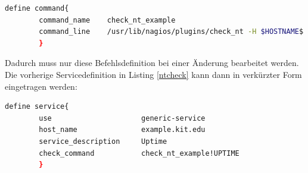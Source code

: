 \begin{lstlisting}[captionpos=b, caption=Server spezifische Befehlsdefinition, label=cus-nt-servdef, breaklines = true, language=sh]        
define command{
        command_name    check_nt_example
        command_line    /usr/lib/nagios/plugins/check_nt -H $HOSTNAME$ -p 13597 -p secret -v $ARG1$
        }
\end{lstlisting}

Dadurch muss nur diese Befehlsdefinition bei einer Änderung bearbeitet werden.
Die vorherige Servicedefinition in Listing \ref{ntcheck} kann dann in verkürzter Form eingetragen werden:

\begin{lstlisting}[captionpos=b, caption=Verkürzte Servicedefinition des NSClient-Checks, label=nt-servdef, breaklines = true, language=sh]
define service{
        use                     generic-service
        host_name               example.kit.edu
        service_description     Uptime
        check_command           check_nt_example!UPTIME
        }
\end{lstlisting}


